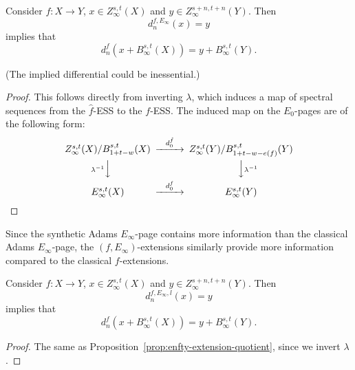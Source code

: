 \begin{proposition}\label{prop:enfty-extension-quotient}
    Consider $f: X\to Y$, $x\in Z_\infty^{s,t}(X)$ and $y\in Z_\infty^{s+n,t+n}(Y)$.
    Then
    $$d^{f,E_\infty}_n(x)=y$$
    implies that
    $$d^{f}_n(x+B_\infty^{s,t}(X))=y+B_\infty^{s,t}(Y).$$
\end{proposition}
(The implied differential could be inessential.)
\begin{proof}
  This follows directly from inverting $\lambda$, which induces a map of spectral sequences from the $\hat f$-ESS to the $f$-ESS. The induced map on the $E_0$-pages are of the following form:
    $$\begin{CD}
    Z_\infty^{s,t}(X)/B_{1+t-w}^{s,t}(X) @>{d^{\hat f}_0}>> Z_\infty^{s,t}(Y)/B_{1+t-w-e(f)}^{s,t}(Y) \\
    @V{\lambda^{-1}}VV @VV{\lambda^{-1}}V \\
    E_\infty^{s,t}(X) @>{d^{f}_0}>> E_\infty^{s, t}(Y)
    \end{CD}$$
\end{proof}
\begin{remark}
    Since the synthetic Adams $E_\infty$-page contains more information than the classical Adams $E_\infty$-page, the $(f,E_\infty)$-extensions similarly provide more information compared to the classical $f$-extensions.
\end{remark}

\begin{proposition}\label{prop:enfty-level-extension-quotient}
    Consider $f: X\to Y$, $x\in Z_\infty^{s,t}(X)$ and $y\in Z_\infty^{s+n,t+n}(Y)$.
    Then
    $$d^{f,E_\infty, l}_n(x)=y$$
    implies that
    $$d^{f}_n(x+B_\infty^{s,t}(X))=y+B_\infty^{s,t}(Y).$$
\end{proposition}
\begin{proof}
    The same as Proposition~\ref{prop:enfty-extension-quotient}, since we invert $\lambda$.
\end{proof}

